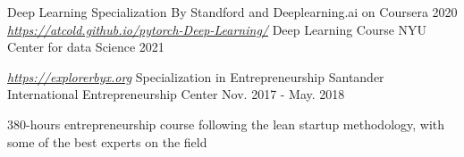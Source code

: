\begin{cventries}
    {Deep Learning Specialization} %
    {By Standford and Deeplearning.ai on Coursera} %
    {2020} %
  \cventry
    {\href{https://atcold.github.io/pytorch-Deep-Learning/}{\textit{https://atcold.github.io/pytorch-Deep-Learning/}}} %
    {Deep Learning Course} %
    {NYU Center for data Science} %
    {2021} %
    {
    \begin{cvitems} %
    \end{cvitems}
    }
  \cventry
    {\href{https://explorerbyx.org}{\textit{https://explorerbyx.org}}} %
    {Specialization in Entrepreneurship} %
    {Santander International Entrepreneurship Center} %
    {Nov. 2017 - May. 2018} %
    {
    \begin{cvitems} %
        \item {380-hours entrepreneurship course following the lean startup  methodology, with some of the best experts on the field}
    \end{cvitems}
    }
\end{cventries}
